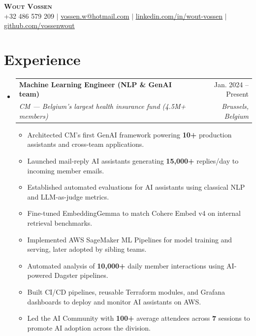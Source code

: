 \documentclass[letterpaper,11pt]{article}
\makeatletter
\newcommand{\resumeItem}[1]{
  \item\small{
    {#1 \vspace{-2pt}}
  }
}
\newcommand{\resumeSubheading}[4]{
  \vspace{-2pt}\item
    \begin{tabular*}{0.97\textwidth}[t]{l@{\extracolsep{\fill}}r}
      \textbf{#1} & #2 \\
      \textit{\small#3} & \textit{\small #4} \\
    \end{tabular*}\vspace{-7pt}
}
\newcommand{\resumeSubHeadingListStart}{\begin{itemize}[leftmargin=0.15in, label={}]}
\newcommand{\resumeSubHeadingListEnd}{\end{itemize}}
\newcommand{\resumeItemListStart}{\begin{itemize}}
\newcommand{\resumeItemListEnd}{\end{itemize}\vspace{-5pt}}
\makeatother
\begin{document}

\begin{center}
    \textbf{\Huge \scshape Wout Vossen} \\ \vspace{1pt}
    \small +32 486 579 209 $|$ 
    \href{mailto:vossen.w@hotmail.com}{\underline{vossen.w@hotmail.com}} $|$ 
    \href{https://www.linkedin.com/in/wout-vossen/}{\underline{linkedin.com/in/wout-vossen}} $|$
    \href{https://github.com/vossenwout}{\underline{github.com/vossenwout}}

\end{center}





\section{Experience}
  \resumeSubHeadingListStart

    \resumeSubheading
      {Machine Learning Engineer (NLP \& GenAI team)}{Jan. 2024 -- Present}
      {CM --- Belgium's largest health insurance fund (4.5M+ members)}{Brussels, Belgium}
      \resumeItemListStart
        \resumeItem{Architected CM's first GenAI framework powering \textbf{10+} production assistants and cross-team applications.}
        \resumeItem{Launched mail-reply AI assistants generating \textbf{15,000+} replies/day to incoming member emails.}
        \resumeItem{Established automated evaluations for AI assistants using classical NLP and LLM-as-judge metrics.}
          \resumeItem{Fine-tuned EmbeddingGemma to match Cohere Embed v4 on internal retrieval benchmarks.}
        \resumeItem{Implemented AWS SageMaker ML Pipelines for model training and serving, later adopted by sibling teams.}
        \resumeItem{Automated analysis of \textbf{10,000+} daily member interactions using AI-powered Dagster pipelines.}
        \resumeItem{Built CI/CD pipelines, reusable Terraform modules, and Grafana dashboards to deploy and monitor AI assistants on AWS.}
       \resumeItem{Led the AI Community with \textbf{100+} average attendees across \textbf{7} sessions to promote AI adoption across the division.}
      \resumeItemListEnd
  \resumeSubHeadingListEnd
\end{document}
